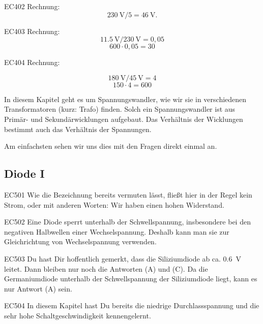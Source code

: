 \begin{sol}{EC402}
Rechnung: $$\SI{230}{\volt} / 5 = \SI{46}{\volt}.$$ 
\end{sol}

\begin{sol}{EC403}
Rechnung: 
$$\SI{11,5}{\volt} / \SI{230}{\volt} = 0,05$$
$$600 \cdot 0,05 = 30$$ 
\end{sol}

\begin{sol}{EC404}
Rechnung: 

$$\SI{180}{\volt} / \SI{45}{\volt} = 4$$
$$150 \cdot 4 = 600$$ 
\end{sol}

\begin{ohmchapter}
  In diesem Kapitel geht es um Spannungswandler, wie wir sie in verschiedenen Transformatoren (kurz: Trafo) finden.
  Solch ein Spannungswandler ist aus Primär- und Sekundärwicklungen aufgebaut.
  Das Verhältnis der Wicklungen bestimmt auch das Verhältnis der Spannungen.

  Am einfachsten sehen wir uns dies mit den Fragen direkt einmal an.

\end{ohmchapter}

\subsection{Diode I}

\begin{sol}{EC501}
Wie die Bezeichnung  bereits vermuten lässt, fließt hier in der Regel kein Strom, oder mit anderen Worten: Wir haben einen hohen Widerstand.
\end{sol}

\begin{sol}{EC502}
  Eine Diode sperrt unterhalb der Schwellspannung, insbesondere bei den negativen Halbwellen einer Wechselspannung. Deshalb kann man sie zur Gleichrichtung von Wechselspannung verwenden.
\end{sol}

\begin{sol}{EC503}
  Du hast Dir hoffentlich gemerkt, dass die Siliziumdiode ab ca. \SI{0,6}{\volt} leitet. Dann bleiben nur noch die Antworten (A) und (C). Da die Germaniumdiode unterhalb der Schwellspannung der Siliziumdiode liegt, kann es nur Antwort (A) sein.   
\end{sol}

\begin{sol}{EC504}
  In diesem Kapitel hast Du bereits die niedrige Durchlassspannung und die sehr hohe Schaltgeschwindigkeit kennengelernt.
\end{sol}

